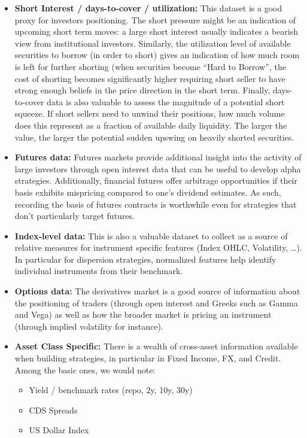 \begin{itemize}
\item \textbf{Short Interest / days-to-cover / utilization:} This dataset is a good proxy for investors positioning. The short pressure might be an indication of upcoming short term moves: a large short interest usually indicates a bearish view from institutional investors. Similarly, the utilization level of available securities to borrow (in order to short) gives an indication of how much room is left for further shorting (when securities become ``Hard to Borrow'', the cost of shorting becomes significantly higher requiring short seller to have strong enough beliefs in the price direction in the short term. Finally, days-to-cover data is also valuable to assess the magnitude of a potential short squeeze. If short sellers need to unwind their positions, how much volume does this represent as a fraction of available daily liquidity. The larger the value, the larger the potential sudden upswing on heavily shorted securities.

\item \textbf{Futures data:} Futures markets provide additional insight into the activity of large investors through open interest data that can be useful to develop alpha strategies. Additionally, financial futures offer arbitrage opportunities if their basis exhibits mispricing compared to one's dividend estimates. As such, recording the basis of futures contracts is worthwhile even for strategies that don't particularly target futures.

\item \textbf{Index-level data:} This is also a valuable dataset to collect as a source of relative measures for instrument specific features (Index OHLC, Volatility, \dots). In particular for dispersion strategies, normalized features help identify individual instruments from their benchmark. 

\item \textbf{Options data:} The derivatives market is a good source of information about the positioning of traders (through open interest and Greeks such as Gamma and Vega) as well as how the broader market is pricing an instrument (through implied volatility for instance).

\item \textbf{Asset Class Specific:} There is a wealth of cross-asset information available when building strategies, in particular in Fixed Income, FX, and Credit. Among the basic ones, we would note:
        \begin{itemize}
        \item Yield / benchmark rates (repo, 2y, 10y, 30y)
        \item CDS Spreads
        \item US Dollar Index
        \end{itemize}
\end{itemize}

